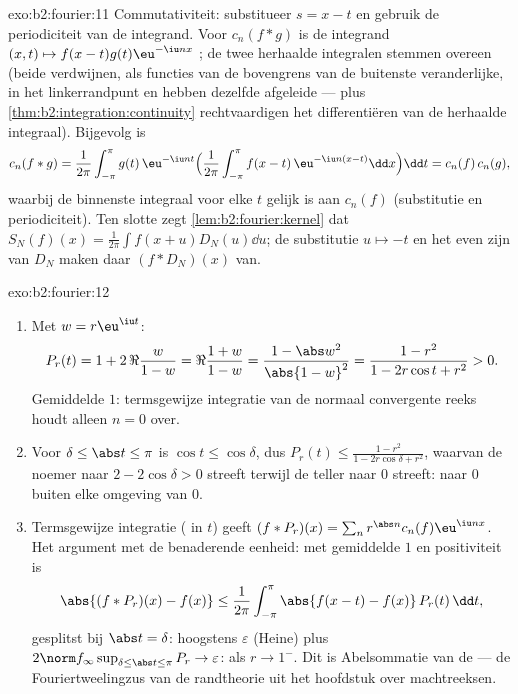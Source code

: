 \begin{solution}{exo:b2:fourier:11}
Commutativiteit: substitueer $s = x - t$ en gebruik de
periodiciteit van de integrand. Voor $c_n(f * g)$ is de integrand
$(x, t) \mapsto f(x-t)g(t)\eu^{-\iu nx}$ ; de twee
herhaalde integralen stemmen overeen (beide verdwijnen, als
functies van de bovengrens van de buitenste veranderlijke, in het
linkerrandpunt en hebben dezelfde afgeleide ---  plus
\cref{thm:b2:integration:continuity} rechtvaardigen het
differentiëren van de herhaalde integraal). Bijgevolg is
\[
c_n(f*g) = \frac{1}{2\pi}\int_{-\pi}^{\pi} g(t)\,\eu^{-\iu nt}
\Bigl(\frac{1}{2\pi}\int_{-\pi}^{\pi}
f(x-t)\,\eu^{-\iu n(x-t)}\dd x\Bigr)\dd t
= c_n(f)\,c_n(g),
\]
waarbij de binnenste integraal voor elke $t$ gelijk is aan $c_n(f)$
(substitutie en periodiciteit). Ten slotte zegt
\cref{lem:b2:fourier:kernel} dat $S_N(f)(x) = \frac{1}{2\pi}\int
f(x+u)D_N(u)\dd u$; de substitutie $u \mapsto -t$ en het even zijn
van $D_N$ maken daar $(f * D_N)(x)$ van.
\end{solution}

\begin{solution}{exo:b2:fourier:12}
\begin{enumerate}
  \item Met $w = r\eu^{\iu t}$:
        \[
        P_r(t) = 1 + 2\,\Re\frac{w}{1 - w}
        = \Re\frac{1 + w}{1 - w}
        = \frac{1 - \abs w^2}{\abs{1 - w}^2}
        = \frac{1 - r^2}{1 - 2r\cos t + r^2} > 0 .
        \]
        Gemiddelde $1$: termsgewijze integratie van de normaal
        convergente reeks houdt alleen $n = 0$ over.
  \item Voor $\delta \leq \abs t \leq \pi$ is $\cos t \leq
        \cos\delta$, dus $P_r(t) \leq \frac{1 - r^2}{1 -
        2r\cos\delta + r^2}$, waarvan de noemer naar $2 -
        2\cos\delta > 0$ streeft terwijl de teller naar $0$
        streeft:  naar $0$ buiten elke
        omgeving van $0$.
  \item Termsgewijze integratie ( in $t$)
        geeft $(f * P_r)(x) = \sum_n r^{\abs
        n}c_n(f)\eu^{\iu nx}$. Het argument met de benaderende
        eenheid: met gemiddelde $1$ en positiviteit is
        \[
        \abs{(f*P_r)(x) - f(x)}
        \leq \frac{1}{2\pi}\int_{-\pi}^{\pi}
        \abs{f(x-t) - f(x)}\,P_r(t)\,\dd t ,
        \]
        gesplitst bij $\abs t = \delta$: hoogstens $\varepsilon$
        (Heine) plus $2\norm f_\infty\sup_{\delta\leq\abs
        t\leq\pi}P_r \to \varepsilon$:  als
        $r \to 1^-$. Dit is Abelsommatie van de  ---
        de Fouriertweelingzus van de randtheorie uit het hoofdstuk
        over machtreeksen.
\end{enumerate}
\end{solution}

